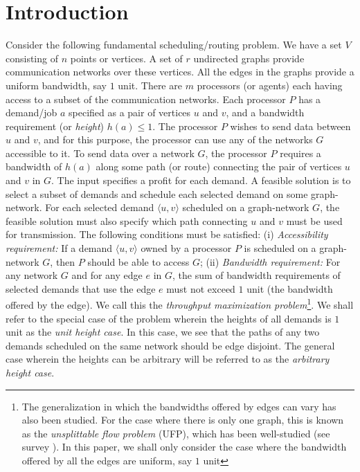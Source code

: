 \documentclass[11pt]{article}
\newcommand{\pair}[2] {\langle #1,#2 \rangle}
\begin{document}
\section{Introduction}
Consider the following fundamental scheduling/routing problem.
We have a set $V$ consisting of $n$ points or vertices.
A set of $r$ undirected graphs provide communication networks over these vertices.
All the edges in the graphs provide a uniform bandwidth, say $1$ unit.
There are $m$ processors (or agents) each having access to a subset of the communication networks.
Each processor $P$ has a demand/job $a$ specified as a pair of vertices $u$ and $v$,
and a bandwidth requirement (or {\em height}) $h(a)\leq 1$.
The processor $P$ wishes to send data between $u$ and $v$,
and for this purpose, the processor can use any of the networks $G$ accessible to it.
To send data over a network $G$, the processor $P$ 
requires a bandwidth of $h(a)$ along some path (or route) connecting the pair of vertices 
$u$ and $v$ in $G$. The input specifies a profit for each demand.
A feasible solution is to select a subset of demands and schedule each selected demand on some graph-network.
For each selected demand $\pair{u}{v}$ scheduled on a graph-network $G$,
the feasible solution must also specify which path connecting $u$ and $v$ must be used for transmission.
The following conditions must be satisfied:
(i) {\em Accessibility requirement: }If a demand $\pair{u}{v}$ owned by a processor $P$
is scheduled on a graph-network $G$, then $P$ should be able to access $G$;
(ii) {\em Bandwidth requirement: }For any network $G$ and for any edge $e$ in $G$, 
the sum of bandwidth requirements of selected demands that use the edge $e$ must not exceed $1$ unit 
(the bandwidth offered by the edge).
We call this the {\em throughput maximization problem}\footnote{The generalization in which the bandwidths offered by edges can vary has also been studied.
For the case where there is only one graph, this is known as the {\em unsplittable flow problem} (UFP),
which has been well-studied (see survey \cite{UFPSurvey}). 
In this paper, we shall only consider the case where the bandwidth offered by all the edges are uniform, say $1$ unit}.
We shall refer to the special case of the problem wherein the heights of all demands is $1$ unit 
as the {\em unit height case}.
In this case, we see that the paths of any two demands scheduled on the same network should be edge disjoint. 
The general case wherein the heights can be arbitrary will be referred
to as the {\em arbitrary height case}.
\end{document}
